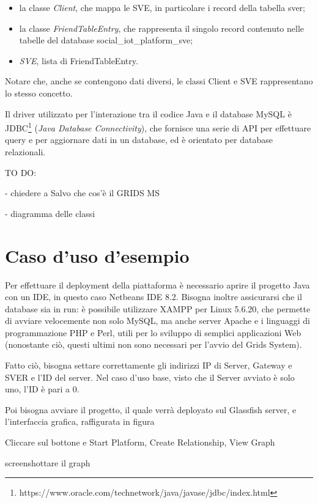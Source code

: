 \begin{itemize}
    \item la classe \textit{Client}, che mappa le SVE, in particolare i record della tabella sver;
    \item la classe \textit{FriendTableEntry}, che rappresenta il singolo record contenuto nelle tabelle del database social\_iot\_platform\_sve;
    \item \textit{SVE}, lista di FriendTableEntry.
\end{itemize}

Notare che, anche se contengono dati diversi, le classi Client e SVE rappresentano lo stesso concetto.

Il driver utilizzato per l'interazione tra il codice Java e il database MySQL è JDBC\footnote{https://www.oracle.com/technetwork/java/javase/jdbc/index.html} (\textit{Java Database Connectivity}), che fornisce una serie di API per effettuare query e per aggiornare dati in un database, ed è orientato per database relazionali.

TO DO:

- chiedere a Salvo che cos'è il GRIDS MS

- diagramma delle classi

\section{Caso d'uso d'esempio}
\label{c:grids:usecase}

Per effettuare il deployment della piattaforma è necessario aprire il progetto Java con un IDE, in questo caso Netbeans IDE 8.2. Bisogna inoltre assicurarsi che il database sia in run: è possibile utilizzare XAMPP per Linux 5.6.20, che permette di avviare velocemente non solo MySQL, ma anche server Apache e i linguaggi di programmazione PHP e Perl, utili per lo sviluppo di semplici applicazioni Web (nonostante ciò, questi ultimi non sono necessari per l'avvio del Grids System). 

Fatto ciò, bisogna settare correttamente gli indirizzi IP di Server, Gateway e SVER e l'ID del server. Nel caso d'uso base, visto che il Server avviato è solo uno, l'ID è pari a 0. 

Poi bisogna avviare il progetto, il quale verrà deployato sul Glassfish server, e l'interfaccia grafica, raffigurata in figura%


Cliccare sul bottone e Start Platform, Create Relationship, View Graph

screenshottare il graph

